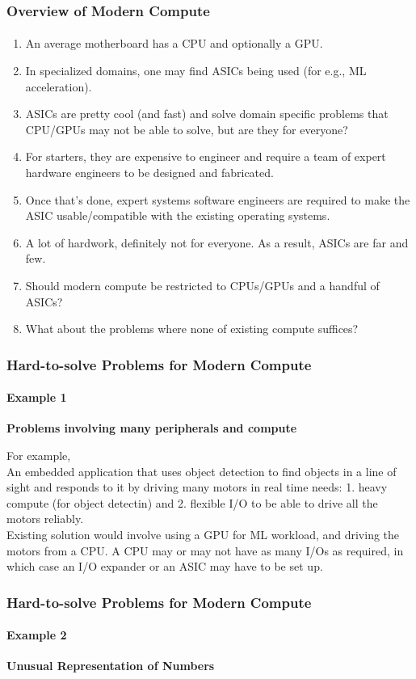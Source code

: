 \documentclass{beamer}
\begin{document}
{\begin{frame}[fragile]
\frametitle{Overview of Modern Compute}
\framesubtitle{}
  \begin{enumerate}
    \item An average motherboard has a CPU and optionally a GPU.
    \item In specialized domains, one may find ASICs being used (for e.g., 
      ML acceleration).
    \item ASICs are pretty cool (and fast) and solve domain specific problems
      that CPU/GPUs may not be able to solve, but are they for everyone?
    \item For starters, they are expensive to engineer and require a team
      of expert hardware engineers to be designed and fabricated.
    \item Once that's done, expert systems software engineers are required
      to make the ASIC usable/compatible with the existing operating systems.
    \item A lot of hardwork, definitely not for everyone.  As a result, ASICs are far and few.
    \item Should modern compute be restricted to CPUs/GPUs and a handful
      of ASICs?
    \item What about the problems where none of existing compute suffices?
  \end{enumerate}
\end{frame}

\begin{frame}[fragile]
  \frametitle{Hard-to-solve Problems for Modern Compute}
  \framesubtitle{Example 1}
  \textbf{Problems involving many peripherals and compute}

  For example, \\

  An embedded application that uses object detection to find
  objects in a line of sight and responds to it by driving many motors in
  real time needs: 1. heavy compute (for object detectin) and 2. flexible I/O to be able to 
  drive all the motors reliably. \\

  Existing solution would involve using a GPU for ML workload, and
  driving the motors from a CPU. A CPU may or may not have as many I/Os
  as required, in which case an I/O expander or an ASIC may have to be set up.
\end{frame}

\begin{frame}[fragile]
  \frametitle{Hard-to-solve Problems for Modern Compute}
  \framesubtitle{Example 2}
  \textbf{Unusual Representation of Numbers}


\end{frame}}
\end{document}
